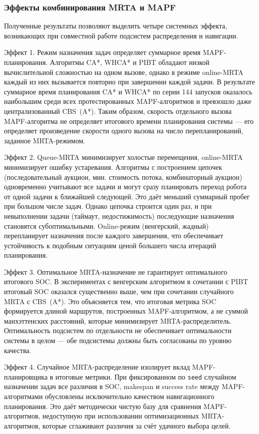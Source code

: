 \subsubsection{Эффекты комбинирования MRTA и MAPF}

Полученные результаты позволяют выделить четыре системных эффекта, возникающих при совместной работе подсистем распределения и навигации.

Эффект 1. Режим назначения задач определяет суммарное время MAPF-планирования. Алгоритмы CA*, WHCA* и PIBT обладают низкой вычислительной сложностью на одном вызове, однако в режиме online-MRTA каждый из них вызывается повторно при завершении каждой задачи. В результате суммарное время планирования CA* и WHCA* по серии 144 запусков оказалось наибольшим среди всех протестированных MAPF-алгоритмов и превзошло даже централизованный CBS~(A*). Таким образом, скорость отдельного вызова MAPF-алгоритма не определяет итогового времени планирования системы --- его определяет произведение скорости одного вызова на число перепланирований, заданное MRTA-режимом.

Эффект 2. Queue-MRTA минимизирует холостые перемещения, online-MRTA минимизирует ошибку устаревания. Алгоритмы с построением цепочек (последовательный аукцион, мин. стоимость потока, комбинаторный аукцион) одновременно учитывают все задачи и могут сразу планировать переход робота от одной задачи к ближайшей следующей. Это даёт меньший суммарный пробег при большом числе задач. Однако цепочка строится один раз, и при невыполнении задачи (таймаут, недостижимость) последующие назначения становятся субоптимальными. Online-режим (венгерский, жадный) перепланирует назначения после каждого завершения, что обеспечивает устойчивость к подобным ситуациям ценой большего числа итераций планирования.

Эффект 3. Оптимальное MRTA-назначение не гарантирует оптимального итогового SOC. В экспериментах с венгерским алгоритмом в сочетании с PIBT итоговый SOC оказался существенно выше, чем при сочетании случайного MRTA с CBS~(A*). Это объясняется тем, что итоговая метрика SOC формируется длиной маршрутов, построенных MAPF-алгоритмом, а не суммой манхэттенских расстояний, которые минимизирует MRTA-распределитель. Оптимальность подсистем по отдельности не обеспечивает оптимальности системы в целом --- обе подсистемы должны быть согласованы по уровню качества.

Эффект 4. Случайное MRTA-распределение изолирует вклад MAPF-планировщика в итоговые метрики. При фиксированном по \texttt{seed} случайном назначении задач все различия в SOC, makespan и success rate между MAPF-алгоритмами обусловлены исключительно качеством навигационного планирования. Это даёт методически чистую базу для сравнения MAPF-алгоритмов, недоступную при использовании оптимизационных MRTA-алгоритмов, которые сглаживают различия за счёт удачного выбора целей.

